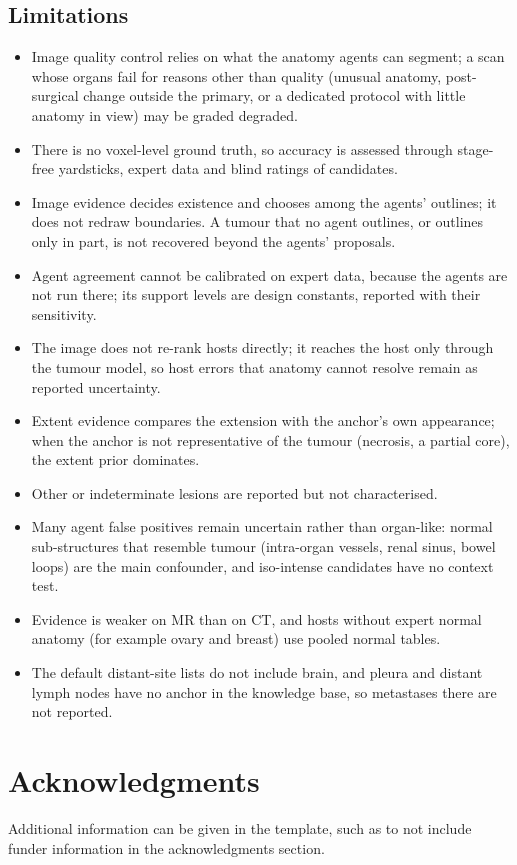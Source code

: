 \documentclass[fleqn,10pt]{olplainarticle}
\begin{document}
\subsection{Limitations}
\begin{itemize}
  \item Image quality control relies on what the anatomy agents can segment; a scan whose organs fail for reasons other than quality (unusual anatomy, post-surgical change outside the primary, or a dedicated protocol with little anatomy in view) may be graded degraded.
  \item There is no voxel-level ground truth, so accuracy is assessed through stage-free yardsticks, expert data and
  blind ratings of candidates.
  \item Image evidence decides existence and chooses among the agents' outlines; it does not redraw boundaries. A tumour
  that no agent outlines, or outlines only in part, is not recovered beyond the agents' proposals.
  \item Agent agreement cannot be calibrated on expert data, because the agents are not run there; its support levels are
  design constants, reported with their sensitivity.
  \item The image does not re-rank hosts directly; it reaches the host only through the tumour model, so host errors that
  anatomy cannot resolve remain as reported uncertainty.
  \item Extent evidence compares the extension with the anchor's own appearance; when the anchor is not representative of
  the tumour (necrosis, a partial core), the extent prior dominates.
  \item Other or indeterminate lesions are reported but not characterised.
  \item Many agent false positives remain uncertain rather than organ-like: normal sub-structures that resemble tumour
  (intra-organ vessels, renal sinus, bowel loops) are the main confounder, and iso-intense candidates have no context test.
  \item Evidence is weaker on MR than on CT, and hosts without expert normal anatomy (for example ovary and breast) use pooled
  normal tables.
  \item The default distant-site lists do not include brain, and pleura and distant lymph nodes have no anchor in
  the knowledge base, so metastases there are not reported.
\end{itemize}

\section*{Acknowledgments}

Additional information can be given in the template, such as to not include funder information in the acknowledgments section.


\end{document}
